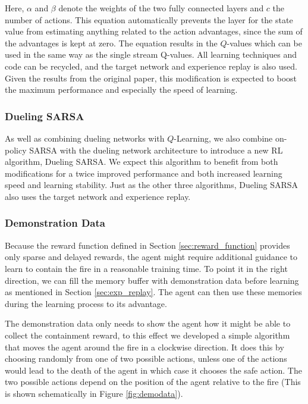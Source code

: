 Here, $\alpha$ and $\beta$ denote the weights of the two fully connected layers and $c$ the number of actions. This equation automatically prevents the layer for the state value from estimating anything related to the action advantages, since the sum of the advantages is kept at zero. The equation results in the $Q$-values which can be used in the same way as the single stream Q-values. All learning techniques and code can be recycled, and the target network and experience replay is also used. Given the results from the original paper, this modification is expected to boost the maximum performance and especially the speed of learning. 

\subsubsection{Dueling SARSA}\label{sec:duelingsarsa}
As well as combining dueling networks with $Q$-Learning, we also combine on-policy SARSA with the dueling network architecture to introduce a new RL algorithm, Dueling SARSA. We expect this algorithm to benefit from both modifications for a twice improved performance and both increased learning speed and learning stability. Just as the other three algorithms, Dueling SARSA also uses the target network and experience replay.


\subsubsection{Demonstration Data}\label{sec:demo_data}
Because the reward function defined in Section \ref{sec:reward_function} provides only sparse and delayed rewards, the agent might require additional guidance to learn to contain the fire in a reasonable training time. To point it in the right direction, we can fill the memory buffer with demonstration data before learning as mentioned in Section \ref{sec:exp_replay}. The agent can then use these memories during the learning process to its advantage.

The demonstration data only needs to show the agent how it might be able to collect the containment reward, to this effect we developed a simple algorithm that moves the agent around the fire in a clockwise direction. It does this by choosing randomly from one of two possible actions, unless one of the actions would lead to the death of the agent in which case it chooses the safe action. The two possible actions depend on the position of the agent relative to the fire (This is shown schematically in Figure \ref{fig:demodata}).

